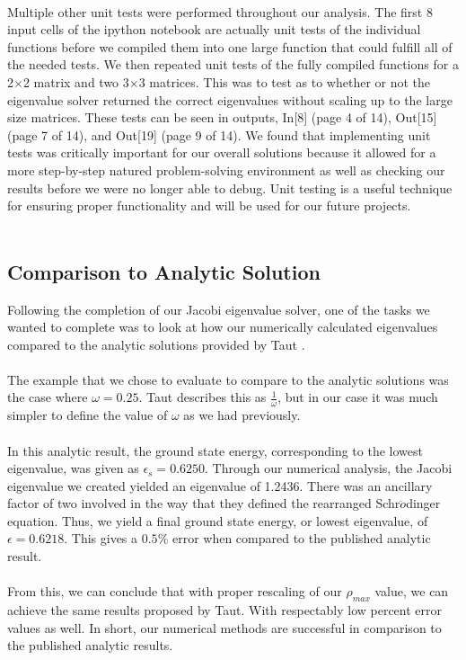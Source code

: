 \documentclass{article}
\begin{document}
\\
Multiple other unit tests were performed throughout our analysis. The first 8 input cells of the ipython notebook are actually unit tests of the individual functions before we compiled them into one large function that could fulfill all of the needed tests. We then repeated unit tests of the fully compiled functions for a 2$\times$2 matrix and two 3$\times$3 matrices. This was to test as to whether or not the eigenvalue solver returned the correct eigenvalues without scaling up to the large size matrices. These tests can be seen in outputs, In[8] (page 4 of 14), Out[15] (page 7 of 14), and Out[19] (page 9 of 14). We found that implementing unit tests was critically important for our overall solutions because it allowed for a more step-by-step natured problem-solving environment as well as checking our results before we were no longer able to debug. Unit testing is a useful technique for ensuring proper functionality and will be used for our future projects.\\
\\

\subsection{Comparison to Analytic Solution}
Following the completion of our Jacobi eigenvalue solver, one of the tasks we wanted to complete was to look at how our numerically calculated eigenvalues compared to the analytic solutions provided by Taut \cite{journal}. \\
\\
The example that we chose to evaluate to compare to the analytic solutions was the case where $\omega=0.25$. Taut describes this as $\frac{1}{\omega}$, but in our case it was much simpler to define the value of $\omega$ as we had previously. \\
\\
In this analytic result, the ground state energy, corresponding to the lowest eigenvalue, was given as $\epsilon_{s}=0.6250$. Through our numerical analysis, the Jacobi eigenvalue we created yielded an eigenvalue of 1.2436. There was an ancillary factor of two involved in the way that they defined the rearranged Schr$\ddot{o}$dinger equation. Thus, we yield a final ground state energy, or lowest eigenvalue, of $\epsilon=0.6218$. This gives a $0.5\%$ error when compared to the published analytic result. \\
\\
From this, we can conclude that with proper rescaling of our $\rho_{max}$ value, we can achieve the same results proposed by Taut. With respectably low percent error values as well. In short, our numerical methods are successful in comparison to the published analytic results.
\end{document}
